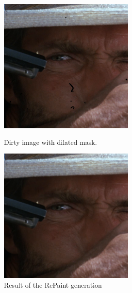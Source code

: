 \documentclass[openany, 12pt]{article}
\begin{document}
\begin{figure}[htbp]
	\centering
	\begin{minipage}{0.45\textwidth}
		\centering
		\includegraphics[width=\textwidth]{images/masked_3.png}
		\caption{\smaller Dirty image with dilated mask.}
	\end{minipage}
	\hspace{0.05\textwidth}
	\begin{minipage}{0.45\textwidth}
		\centering
		\includegraphics[width=\textwidth]{images/inpainted_3.png}
		\caption{Result of the RePaint generation}
	\end{minipage}
\end{figure}
\end{document}
